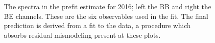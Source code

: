 \begin{figure}[!htbp]{
\caption{The \mgg spectra in the prefit estimate for 2016; left the BB and right the BE channels.
These are the six observables used in the fit.
The final prediction is derived from a fit to the data, a procedure which absorbs residual mismodeling present at these plots.
}
\label{fig:Prefit_spectra2016}}
\end{figure}

